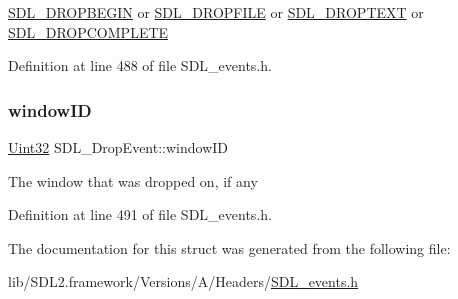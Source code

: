 \mbox{\hyperlink{_s_d_l__events_8h_a3b589e89be6b35c02e0dd34a55f3fccaa0809886c132aaf734fff6f2abf466912}{S\+D\+L\+\_\+\+D\+R\+O\+P\+B\+E\+G\+IN}} or \mbox{\hyperlink{_s_d_l__events_8h_a3b589e89be6b35c02e0dd34a55f3fccaad9238862d7aeaebff88be6453ee0fbab}{S\+D\+L\+\_\+\+D\+R\+O\+P\+F\+I\+LE}} or \mbox{\hyperlink{_s_d_l__events_8h_a3b589e89be6b35c02e0dd34a55f3fccaa1d97f901333e40b0ccc4dff1a319213f}{S\+D\+L\+\_\+\+D\+R\+O\+P\+T\+E\+XT}} or \mbox{\hyperlink{_s_d_l__events_8h_a3b589e89be6b35c02e0dd34a55f3fccaaa83e80a89d5c4ff14889d07dddc402ef}{S\+D\+L\+\_\+\+D\+R\+O\+P\+C\+O\+M\+P\+L\+E\+TE}} 

Definition at line 488 of file S\+D\+L\+\_\+events.\+h.

\mbox{\label{struct_s_d_l___drop_event_a8cecd2178cdc04118bf852e7cf7bf647}} 
\subsubsection{\texorpdfstring{windowID}{windowID}}
{\footnotesize\ttfamily \mbox{\hyperlink{_s_d_l__stdinc_8h_add440eff171ea5f55cb00c4a9ab8672d}{Uint32}} S\+D\+L\+\_\+\+Drop\+Event\+::window\+ID}

The window that was dropped on, if any 

Definition at line 491 of file S\+D\+L\+\_\+events.\+h.



The documentation for this struct was generated from the following file\+:\begin{DoxyCompactItemize}
\item 
lib/\+S\+D\+L2.\+framework/\+Versions/\+A/\+Headers/\mbox{\hyperlink{_s_d_l__events_8h}{S\+D\+L\+\_\+events.\+h}}\end{DoxyCompactItemize}
